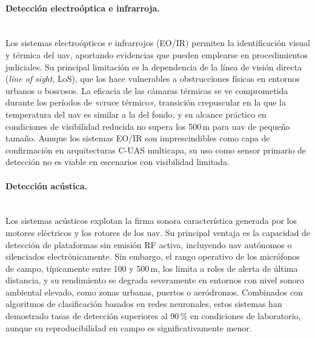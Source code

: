\paragraph{Detección electroóptica e infrarroja.}\mbox{}\\[0.5em]
Los sistemas electroópticos e infrarrojos (EO/IR) permiten la identificación visual
y térmica del \gls{uav}, aportando evidencias que pueden emplearse en procedimientos
judiciales. Su principal limitación es la dependencia de la línea de visión directa
(\textit{line of sight}, LoS), que los hace vulnerables a obstrucciones físicas en
entornos urbanos o boscosos. La eficacia de las cámaras térmicas se ve comprometida
durante los períodos de «cruce térmico», transición crepuscular en la que la
temperatura del \gls{uav} es similar a la del fondo, y su alcance práctico en
condiciones de visibilidad reducida no supera los 500\,m para \gls{uav} de pequeño
tamaño. Aunque los sistemas EO/IR son imprescindibles como capa de confirmación
en arquitecturas C-UAS multicapa, su uso como sensor primario de detección no es
viable en escenarios con visibilidad limitada.

\paragraph{Detección acústica.}\mbox{}\\[0.5em]
Los sistemas acústicos explotan la firma sonora característica generada por los
motores eléctricos y los rotores de los \gls{uav}. Su principal ventaja es la capacidad
de detección de plataformas sin emisión RF activa, incluyendo \gls{uav} autónomos o
silenciados electrónicamente. Sin embargo, el rango operativo de los micrófonos
de campo, típicamente entre 100 y 500\,m, los limita a roles de alerta de última
distancia, y su rendimiento se degrada severamente en entornos con nivel sonoro
ambiental elevado, como zonas urbanas, puertos o aeródromos. Combinados con
algoritmos de clasificación basados en redes neuronales, estos sistemas han
demostrado tasas de detección superiores al 90\,\% en condiciones de laboratorio,
aunque su reproducibilidad en campo es significativamente menor.

